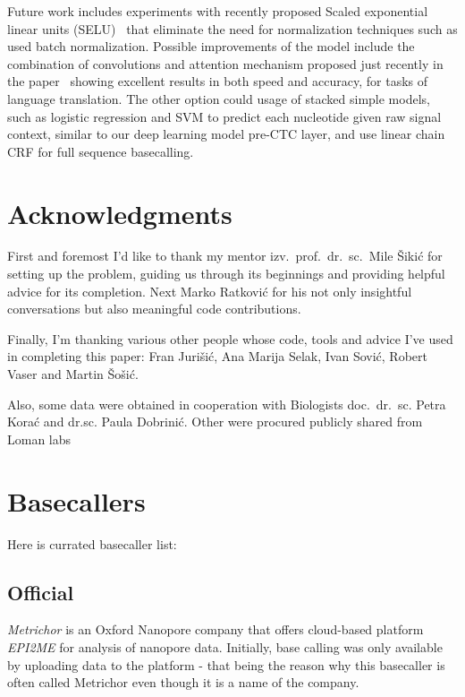 \documentclass[runningheads,a4paper]{llncs}
\begin{document}
Future work includes experiments with recently proposed Scaled exponential linear units (SELU)~\cite{selu} that eliminate the need for normalization techniques such as used batch normalization. Possible improvements of the model include the combination of convolutions and attention mechanism proposed just recently in the paper~\cite{facebook} showing excellent results in both speed and accuracy, for tasks of language translation. The other option could usage of stacked simple models, such as logistic regression and SVM to predict each nucleotide given raw signal context, similar to our deep learning model pre-CTC layer, and use linear chain CRF for full sequence basecalling.

\section{Acknowledgments}
First and foremost I'd like to thank my mentor izv.~prof.~dr.~sc.~Mile Šikić for setting up the problem, guiding us through its beginnings and providing helpful advice for its completion. Next Marko Ratković for his not only insightful conversations but also meaningful code contributions.

Finally, I'm thanking various other people whose code, tools and advice I've used in completing this paper: Fran Jurišić, Ana Marija Selak, Ivan Sović, Robert Vaser and Martin Šošić.

Also, some data were obtained in cooperation with Biologists doc.~dr.~sc. Petra Korać and dr.sc. Paula Dobrinić. Other were procured publicly shared from Loman labs~\cite{loman1-100k}

% 


\appendix
\section{Basecallers}\label{app:basecallers}
Here is currated basecaller list:

\subsection{Official}
\emph{Metrichor} is an Oxford Nanopore company that offers cloud-based platform \emph{EPI2ME} for analysis of nanopore data.
Initially, base calling was only available by uploading data to the platform - that being the reason why this basecaller is often called Metrichor even though it is a name of the company.
\end{document}
